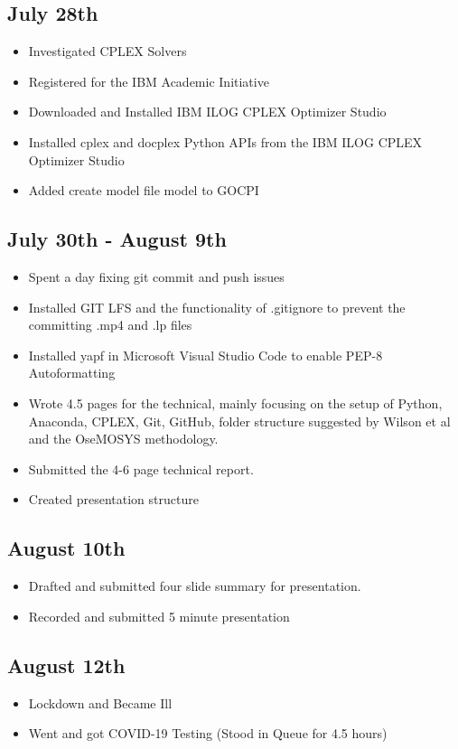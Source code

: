 \documentclass[12pt]{article}
\begin{document}
\subsection{July 28th}
\begin{itemize}
	\item Investigated CPLEX Solvers
	\item Registered for the IBM Academic Initiative
	\item Downloaded and Installed IBM ILOG CPLEX Optimizer Studio
	\item Installed cplex and docplex Python APIs from the IBM ILOG CPLEX Optimizer Studio
	\item Added create model file model to GOCPI
\end{itemize}
\subsection{July 30th - August 9th}
\begin{itemize}
	\item Spent a day fixing git commit and push issues
	\item Installed GIT LFS and the functionality of .gitignore to prevent the committing .mp4 and .lp files
	\item Installed yapf in Microsoft Visual Studio Code to enable PEP-8 Autoformatting
	\item Wrote 4.5 pages for the technical, mainly focusing on the setup of Python, Anaconda, CPLEX, Git, GitHub, folder structure suggested by Wilson et al and the OseMOSYS methodology.
	\item Submitted the 4-6 page technical report.
	\item Created presentation structure 
\end{itemize}
\subsection{August 10th}
\begin{itemize}
	\item Drafted and submitted four slide summary for presentation.
	\item Recorded and submitted 5 minute presentation
\end{itemize}
\subsection{August 12th}
\begin{itemize}
	\item Lockdown and Became Ill
	\item Went and got COVID-19 Testing (Stood in Queue for 4.5 hours)
\end{itemize}
\end{document}
